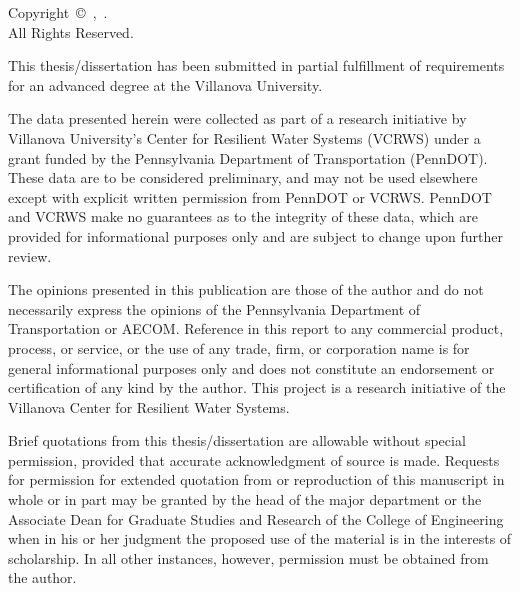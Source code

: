 %

\vspace*{\fill}
\begin{center}
	Copyright~\copyright~\thesisDate,~\thesisName. \\ All Rights Reserved.
\end{center}
\vspace*{\fill}

\pagebreak


This thesis/dissertation has been submitted in partial fulfillment of requirements for an advanced degree at the Villanova University.

The data presented herein were collected as part of a research initiative by Villanova University's Center for Resilient Water Systems (VCRWS) under a grant funded by the Pennsylvania Department of Transportation (PennDOT). These data are to be considered preliminary, and may not be used elsewhere except with explicit written permission from PennDOT or VCRWS. PennDOT and VCRWS make no guarantees as to the integrity of these data, which are provided for informational purposes only and are subject to change upon further review.

The opinions presented in this publication are those of the author and do not necessarily express the opinions of the Pennsylvania Department of Transportation or AECOM. Reference in this report to any commercial product, process, or service, or the use of any trade, firm, or corporation name is for general informational purposes only and does not constitute an endorsement or certification of any kind by the author. This project is a research initiative of the Villanova Center for Resilient Water Systems.

Brief quotations from this thesis/dissertation are allowable without special permission, provided that accurate acknowledgment of source is made. Requests for permission for extended quotation from or reproduction of this manuscript in whole or in part may be granted by the head of the major department or the Associate Dean for Graduate Studies and Research of the College of Engineering when in his or her judgment the proposed use of the material is in the interests of scholarship. In all other instances, however, permission must be obtained from the author.

\label{sec:acknowledgement}

